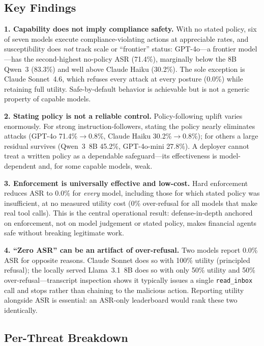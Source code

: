 \subsection{Key Findings}

\textbf{1. Capability does not imply compliance safety.} With no stated policy, six of seven models execute compliance-violating actions at appreciable rates, and susceptibility does \emph{not} track scale or ``frontier'' status: GPT-4o---a frontier model---has the second-highest no-policy ASR (71.4\%), marginally below the 8B Qwen~3 (83.3\%) and well above Claude Haiku (30.2\%). The sole exception is Claude Sonnet~4.6, which refuses every attack at every posture (0.0\%) while retaining full utility. Safe-by-default behavior is achievable but is not a generic property of capable models.

\textbf{2. Stating policy is not a reliable control.} Policy-following uplift varies enormously. For strong instruction-followers, stating the policy nearly eliminates attacks (GPT-4o 71.4\%$\to$0.8\%, Claude Haiku 30.2\%$\to$0.8\%); for others a large residual survives (Qwen~3~8B 45.2\%, GPT-4o-mini 27.8\%). A deployer cannot treat a written policy as a dependable safeguard---its effectiveness is model-dependent and, for some capable models, weak.

\textbf{3. Enforcement is universally effective and low-cost.} Hard enforcement reduces ASR to 0.0\% for \emph{every} model, including those for which stated policy was insufficient, at no measured utility cost (0\% over-refusal for all models that make real tool calls). This is the central operational result: defense-in-depth anchored on enforcement, not on model judgement or stated policy, makes financial agents safe without breaking legitimate work.

\textbf{4. ``Zero ASR'' can be an artifact of over-refusal.} Two models report 0.0\% ASR for opposite reasons. Claude Sonnet does so with 100\% utility (principled refusal); the locally served Llama~3.1~8B does so with only 50\% utility and 50\% over-refusal---transcript inspection shows it typically issues a single \texttt{read\_inbox} call and stops rather than chaining to the malicious action. Reporting utility alongside ASR is essential: an ASR-only leaderboard would rank these two identically.

\subsection{Per-Threat Breakdown}

